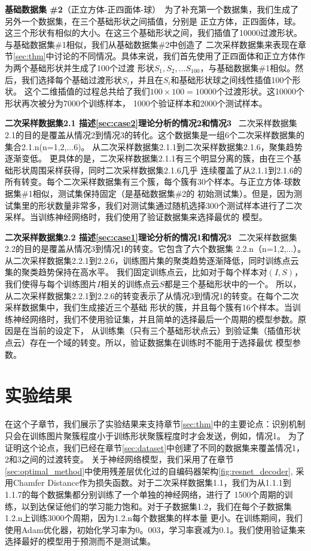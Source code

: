 \documentclass[bachelor, nocolorlinks, printoneside]{seuthesis} %
\begin{document}
\begin{Main}
\textbf{基础数据集 \#2}（正立方体-正四面体-球）~为了补充第一个数据集，我们生成了另外一个数据集，在三个基础形状之间插值，分别是
正立方体，正四面体，球。这三个形状有相似的大小。在这三个基础形状之间，我们插值了10000过渡形状。与基础数据集\#1相似，我们从基础数据集\#2中创造了
二次采样数据集来表现在章节\ref{sec:thm}中讨论的不同情况。具体来说，我们首先使用了正四面体和正立方体作为两个基础形状并生成了100个过渡
形状$S_1,S_2,\ldots S_100$，与基础数据集\#1相似。然后，我们选择每个基础过渡形状$S_i$，并且在$S_i$和基础形状球之间线性插值100个形状。
这个二维插值的过程总共给了我们$100 \times 100 = 10000$个过渡形状。这10000个形状再次被分为7000个训练样本，
1000个验证样本和2000个测试样本。 

\textbf{二次采样数据集2.1 描述\ref{sec:case2}理论分析的情况2和情况3} ~二次采样数据集2.1的目的是覆盖从情况2到情况3的转化。这个数据集是一组6个二次采样数据集的集合2.1.n(n=1,2,...6)。
从二次采样数据集2.1.1到二次采样数据集2.1.6，聚集趋势逐渐变低。
更具体的是，二次采样数据集2.1.1有三个明显分离的簇，由在三个基础形状周围采样获得，同时二次采样数据集2.1.6几乎
连续覆盖了从2.1.1到2.1.6的所有转变。每个二次采样数据集有三个簇，每个簇有30个样本。与正立方体-球数据集$\#$1相似，测试集保持固定（是基础数据集$\#$2的
初始测试集）。但是，因为测试集里的形状数量非常多，我们对测试集通过随机选择300个测试样本进行了二次采样。当训练神经网络时，我们使用了验证数据集来选择最优的
模型。

\textbf{二次采样数据集2.2 描述\ref{sec:case1}理论分析的情况1和情况3} ~二次采样数据集2.2的目的是覆盖从情况3到情况1的转变。它包含了六个数据集
2.2.n（n=1,2,$\ldots$）。从二次采样数据集2.2.1到2.2.6，训练图片集的聚类趋势逐渐降低，同时训练点云集的聚类趋势保持在高水平。
我们固定训练点云，比如对于每个样本对$(I,S)$，我们使得与每个训练图片$I$相关的训练点云$S$都是三个基础形状中的一个。
所以，从二次采样数据集2.2.1到2.2.6的转变表示了从情况3到情况1的转变。在每个二次采样数据集中，我们生成接近三个基础
形状的簇，并且每个簇有16个样本。当训练神经网络时，我们不使用验证集，并且简单的选择最后一个周期的模型参数。原因是在当前的设定下，
从训练集（只有三个基础形状点云）到验证集（插值形状点云）存在一个域的转变。所以，验证数据集在训练时不能用于选择最优
模型参数。


\section{实验结果}
在这个子章节，我们展示了实验结果来支持章节\ref{sec:thm}中的主要论点：识别机制只会在训练图片聚簇程度小于训练形状聚簇程度时才会发送，例如，情况1。
为了证明这个论点，我们已经在章节\ref{sec:dataset}中创建了不同的数据集来覆盖情况1，2和3之间的过渡转变。
关于神经网络模型，我们采用了在章节\ref{sec:optimal_method}中使用残差层优化过的自编码器架构\ref{fig:resnet_decoder},
采用Chamfer Distance作为损失函数。对于二次采样数据集1.1，我们为从1.1.1到1.1.7的每个数据集都分别训练了一个单独的神经网络，进行了
1500个周期的训练，以到达保证他们的学习能力饱和。对于子数据集1.2，我们在每个子数据集1.2.n上训练3000个周期，因为1.2.n每个数据集的样本量
更小。在训练期间，我们使用Adam优化器，初始化学习率为0。003，学习率衰减为0.1。我们使用验证集来选择最好的模型用于预测而不是测试集。


\end{Main}
\end{document}
